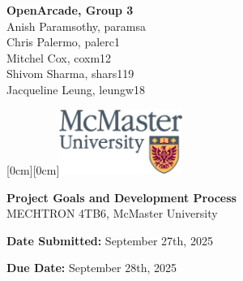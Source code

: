 \documentclass[a4]{article}
\date{\today}
\begin{document}
\begin{titlepage}

	\hspace*{0mm}\textbf{\Large \textcolor{McMasterMaroon}{OpenArcade, Group 3}}\\
	\hspace*{0mm} \large Anish Paramsothy, paramsa\\
	\hspace*{0mm} \large Chris Palermo, palerc1\\
	\hspace*{0mm} \large Mitchel Cox, coxm12\\
	\hspace*{0mm} \large Shivom Sharma, shars119\\
	\hspace*{0mm} \large Jacqueline Leung, leungw18

	\hspace*{\textwidth}
	\hspace{-4cm}
	\vspace{-2cm}
	\raisebox{1cm}[0cm][0cm]{\includegraphics[width=4cm]{m24-col_png.png}}

	\vspace{7cm}


	\begin{center}
		\Huge \textbf{Project Goals and Development Process} \\[1em]
		\Large MECHTRON 4TB6, McMaster University
	\end{center}
	\vspace{7cm}

	\hspace*{0mm} \textbf{\large Date Submitted:} September 27th, 2025

	\hspace*{0mm} \textbf{\large Due Date:} September 28th, 2025
\end{titlepage}
\tableofcontents

\clearpage
\end{document}
